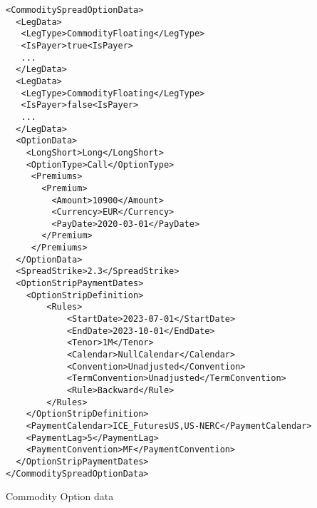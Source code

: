 \begin{listing}[H]
    \begin{verbatim}
<CommoditySpreadOptionData>
  <LegData>
   <LegType>CommodityFloating</LegType>
   <IsPayer>true<IsPayer>
   ...
  </LegData>
  <LegData>
   <LegType>CommodityFloating</LegType>
   <IsPayer>false<IsPayer>
   ...
  </LegData>
  <OptionData>
    <LongShort>Long</LongShort>
    <OptionType>Call</OptionType>
     <Premiums>
       <Premium>
         <Amount>10900</Amount>
         <Currency>EUR</Currency>
         <PayDate>2020-03-01</PayDate>
       </Premium>
     </Premiums>
  </OptionData>
  <SpreadStrike>2.3</SpreadStrike>
  <OptionStripPaymentDates>
  	<OptionStripDefinition>
    	<Rules>
        	<StartDate>2023-07-01</StartDate>
            <EndDate>2023-10-01</EndDate>
            <Tenor>1M</Tenor>
            <Calendar>NullCalendar</Calendar>
            <Convention>Unadjusted</Convention>
            <TermConvention>Unadjusted</TermConvention>
            <Rule>Backward</Rule>
        </Rules>
  	</OptionStripDefinition>
    <PaymentCalendar>ICE_FuturesUS,US-NERC</PaymentCalendar>
    <PaymentLag>5</PaymentLag>
    <PaymentConvention>MF</PaymentConvention>
  </OptionStripPaymentDates>
</CommoditySpreadOptionData>
    \end{verbatim}
    \caption{Commodity Option data}
    \label{lst:com_s_option_data}
\end{listing}

